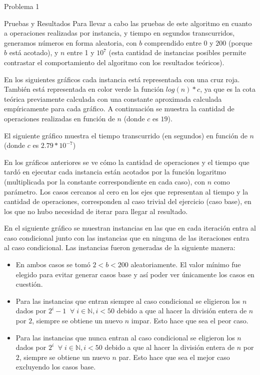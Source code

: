\begin{section}{Problema 1}
\begin{subsection}{Pruebas y Resultados}
		Para llevar a cabo las pruebas de este algoritmo en cuanto a operaciones realizadas por instancia, y tiempo en segundos transcurridos, generamos números en forma aleatoria, con $b$ comprendido entre $0$ y $200$ (porque $b$ está acotado), y $n$ entre 1 y $10^7$ (esta cantidad de instancias posibles permite contrastar el comportamiento del algoritmo con los resultados teóricos). 

En los siguientes gráficos cada instancia está representada con una cruz roja. También está representada en color verde la función $log(n)*c$, ya que es la cota teórica previamente calculada con una constante aproximada calculada empíricamente para cada gráfico.
A continuación se muestra la cantidad de operaciones realizadas en función de $n$ (donde $c$ es $19$). \\
		\VSP

El siguiente gráfico muestra el tiempo transcurrido (en segundos) en función de $n$ (donde $c$ es $2.79*10^{-7}$)\\

En los gráficos anteriores se ve cómo la cantidad de operaciones y el tiempo que tardó en ejecutar cada instancia están acotados por la función logaritmo (multiplicada por la constante correspondiente en cada caso), con $n$ como parámetro. Los casos cercanos al cero en los ejes que representan al tiempo y la cantidad de operaciones, co\-rres\-pon\-den al caso trivial del ejercicio (caso base), en los que no hubo necesidad de iterar para llegar al resultado.

En el siguiente gráfico se muestran instancias en las que en cada iteración entra al caso condicional junto con las instancias que en ninguna de las iteraciones entra al caso condicional. Las instancias fueron generadas de la siguiente manera:
\begin{itemize}
	\item En ambos casos se tomó $2 < b < 200$ aleatoriamente. El valor mínimo fue elegido para evitar generar casos base y así poder ver únicamente los casos en cuestión.
	\item Para las instancias que entran siempre al caso condicional se eligieron los $n$ dados por $2^i-1\;\;\forall\; i\in\mathbb{N}, i < 50$ debido a que al hacer la división entera de $n$ por $2$, siempre se obtiene un nuevo $n$ impar. Esto hace que sea el peor caso.
	\item Para las instancias que nunca entran al caso condicional se eligieron los $n$ dados por $2^i\;\;\forall\; i\in\mathbb{N}, i < 50$ debido a que al hacer la división entera de $n$ por $2$, siempre se obtiene un nuevo $n$ par. Esto hace que sea el mejor caso excluyendo los casos base.
\end{itemize}


\end{subsection}
\end{section}
